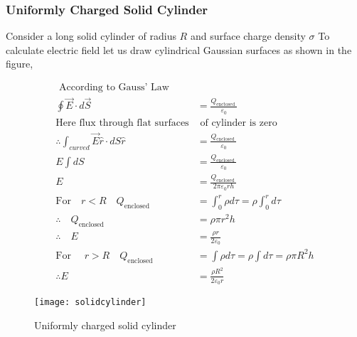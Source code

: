 \subsubsection{Uniformly Charged Solid Cylinder}
Consider a long solid cylinder of radius $R$ and surface charge density $\sigma$ To calculate electric field let us draw cylindrical Gaussian surfaces as shown in the figure,\\
\begin{minipage}{0.75\textwidth}
	\begin{align*}
	\text{ According to Gauss' Law}\\
	\oint \vec{E} \cdot d \vec{S}&=\frac{Q_{\text {enctosed }}}{\varepsilon_{0}}\\
	\text{Here flux through flat surfaces}&\text{  of cylinder is zero}\\
	\therefore \int_{curved} \vec{E} \hat{r} \cdot d S\hat{r}&=\frac{Q_{\text {cnclosed }}}{\varepsilon_{0}}\\
	E \int d S&=\frac{Q_{\text {enclosed }}}{\varepsilon_{0}} \\
	E&=\frac{Q_{\text {enclosed }}}{2 \pi \varepsilon_{0} r h}\\
	\text{For} \quad r<R \quad Q_{\text {enclosed }}&=\int_{0}^{r} \rho d \tau=\rho \int_{0}^{r} d \tau\\
	\therefore \quad Q_{\text {enclosed }}&=\rho \pi r^{2} h \\
	\therefore \quad E&=\frac{\rho r}{2 \varepsilon_{0}}\\
	\text{For }\quad r>R
	\quad Q_{\text {enclosed }}&=\int \rho d \tau=\rho \int d \tau=\rho \pi R^{2} h\\
	\therefore
	E&=\frac{\rho R^{2}}{2 \varepsilon_{0} r}
	\end{align*}
\end{minipage}
\begin{minipage}{0.25\textwidth}\hfil
	\begin{figure}[H]
		\texttt{[image: solidcylinder]}
		\caption{Uniformly charged solid cylinder}
	\end{figure}
\end{minipage}
